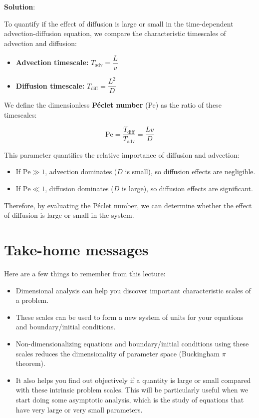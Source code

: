 \\
\\
{\color{red} {\bf Solution}:

To quantify if the effect of diffusion is large or small in the time-dependent advection-diffusion equation, we compare the characteristic timescales of advection and diffusion:

\begin{itemize}
    \item \textbf{Advection timescale:} $T_{\text{adv}} = \dfrac{L}{v}$
    \item \textbf{Diffusion timescale:} $T_{\text{diff}} = \dfrac{L^2}{D}$
\end{itemize}

We define the dimensionless \textbf{Péclet number} (Pe) as the ratio of these timescales:

\[
\text{Pe} = \frac{T_{\text{diff}}}{T_{\text{adv}}} = \frac{L v}{D}
\]

This parameter quantifies the relative importance of diffusion and advection:

\begin{itemize}
    \item If $\text{Pe} \gg 1$, advection dominates ($D$ is small), so diffusion effects are negligible.
    \item If $\text{Pe} \ll 1$, diffusion dominates ($D$ is large), so diffusion effects are significant.
\end{itemize}

Therefore, by evaluating the Péclet number, we can determine whether the effect of diffusion is large or small in the system.

}

\section{Take-home messages}

Here are a few things to remember from this lecture:
\begin{itemize}
    \item Dimensional analysis can help you discover important characteristic scales of a problem.
    \item These scales can be used to form a new system of units for your equations and boundary/initial conditions.
    \item Non-dimensionalizing equations and boundary/initial conditions using these scales reduces the dimensionality of parameter space (Buckingham $\pi$ theorem).
    \item It also helps you find out objectively if a quantity is large or small compared with these intrinsic problem scales. This will be particularly useful when we start doing some asymptotic analysis, which is the study of equations that have very large or very small parameters.
\end{itemize}

